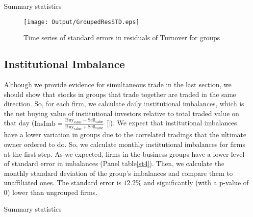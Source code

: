 {			\begin{table}[htbp]
\caption{Summary statistics}
\label{st3}
	\centering
	\label{tab:ResidualTrunSummary}
	\resizebox{\textwidth}{!}{
		
	}
	\bigskip
			\centering
			\label{tab:ResidualTrunStdSummary}
			\resizebox{\textwidth}{!}{
				
			}
		\end{table}
		
		
\begin{figure}[htbp]
	\centering
	\texttt{[image: Output/GroupedResSTD.eps]}

	\caption{Time series of standard errors in residuals of Turnover for groups}
	\label{fig:GroupedResSTD}
\end{figure}






\FloatBarrier

%
%
\subsection{{Institutional Imbalance}}

Although we provide evidence for simultaneous trade in the last section, we should show that stocks in groups that trade together are traded in the same direction. So, for each firm, we calculate daily institutional imbalances, which is the net buying value of institutional investors relative to total traded value on that day ($ \text{InsImb} = \frac{\text{Buy}_{\text{value}} - \text{Sell}_{\text{value}}}{\text{Buy}_{\text{value}} + \text{Sell}_{\text{value}}} $ [\cite{seasholes2007predictable}]). We expect that institutional imbalances have a lower variation in groups due to the correlated tradings that the ultimate owner ordered to do. So, we calculate monthly institutional imbalances for firms at the first step. As we expected, firms in the business groups have a lower level of standard error in imbalances (Panel  table\ref{st4}). Then, we calculate the monthly standard deviation of the group's imbalances and compare them to unaffiliated ones. The standard error is  $12.2\%$ and significantly (with a p-value of 0) lower than ungrouped firms. 
		
	{\begin{table}[htbp]
	\caption{Summary statistics}
	\label{st4}
		\centering
			\label{tab:ImbalanceInsMeanSummary}%
		\resizebox{\textwidth}{!}{
			
		}
	

\end{table}}}
